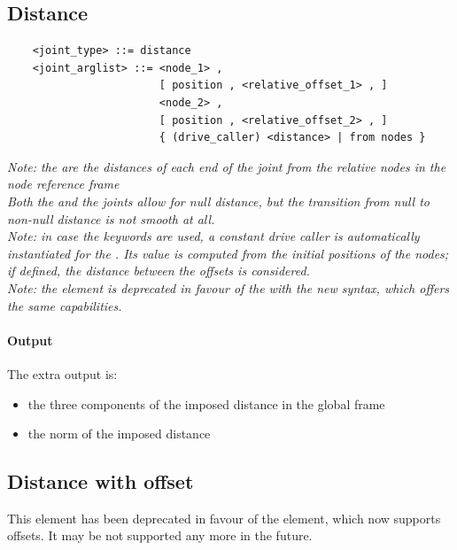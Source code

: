 \subsection{Distance}
\begin{verbatim}
    <joint_type> ::= distance 
    <joint_arglist> ::= <node_1> , 
                        [ position , <relative_offset_1> , ]
                        <node_2> ,
                        [ position , <relative_offset_2> , ]
                        { (drive_caller) <distance> | from nodes }
\end{verbatim}

\noindent
{\em 
    Note: the  are the distances of each end
    of the joint from the relative nodes in the node reference frame \\
    Both the  and the  joints
    allow for null distance, but the transition from null to non-null
    distance is not smooth at all.
} \\
{\em
    Note: in case the keywords  are used, a constant drive
    caller is automatically instantiated for the . 
    Its value is computed from the initial positions of the nodes;
    if defined, the distance between the offsets is considered. 
} \\
{\em
    Note: the  element is deprecated
    in favour of the  with the new syntax, which
    offers the same capabilities.
}
 


\paragraph{Output}
The extra output is:
\begin{itemize}
    \item the three components of the imposed distance in the global frame
    \item the norm of the imposed distance
\end{itemize}



\subsection{Distance with offset}
This element has been deprecated in favour of the 
element, which now supports offsets.  It may be not supported any more
in the future.



